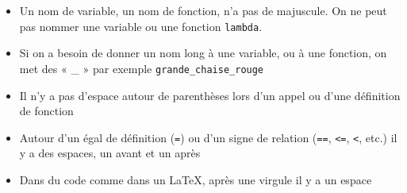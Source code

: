 \documentclass{article}
\newcommand{\p}{\texttt} %
\begin{document}
\begin{itemize}
    \item Un nom de variable, un nom de fonction, n'a pas de majuscule. On ne peut pas nommer une variable ou une fonction \p{lambda}.
    \item Si on a besoin de donner un nom long à une variable, ou à une fonction, on met des « \_ » par exemple \p{grande\_chaise\_rouge}
    \item Il n'y a pas d'espace autour de parenthèses lors d'un appel ou d'une définition de fonction
    \item Autour d'un égal de définition (\p{=}) ou d'un signe de relation (\p{==}, \p{<=}, \p{<}, etc.) il y a des espaces, un avant et un après
    \item Dans du code comme dans un \LaTeX, après une virgule il y a un espace
\end{itemize}
\end{document}
